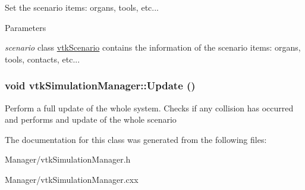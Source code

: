 Set the scenario items: organs, tools, etc... 
\begin{DoxyParams}{Parameters}
\item[{\em scenario}]class \hyperlink{classvtkScenario}{vtkScenario} contains the information of the scenario items: organs, tools, contacts, etc... \end{DoxyParams}
\hypertarget{classvtkSimulationManager_a2d78cb22ac71b2e1e1f549c2df509a60}{
\subsubsection[{Update}]{\setlength{\rightskip}{0pt plus 5cm}void vtkSimulationManager::Update ()}}
\label{classvtkSimulationManager_a2d78cb22ac71b2e1e1f549c2df509a60}


Perform a full update of the whole system. Checks if any collision has occurred and performs and update of the whole scenario 

The documentation for this class was generated from the following files:\begin{DoxyCompactItemize}
\item 
Manager/vtkSimulationManager.h\item 
Manager/vtkSimulationManager.cxx\end{DoxyCompactItemize}
